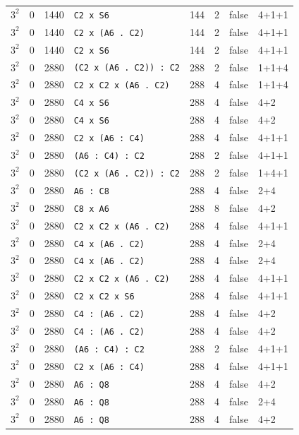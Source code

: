 \begin{longtable}{llrlrrll}
$3^2$ & 0 & 1440 & \texttt{C2 x S6} & 144 & 2 & false & 4+1+1\\
$3^2$ & 0 & 1440 & \texttt{C2 x (A6 . C2)} & 144 & 2 & false & 4+1+1\\
$3^2$ & 0 & 1440 & \texttt{C2 x S6} & 144 & 2 & false & 4+1+1\\
$3^2$ & 0 & 2880 & \texttt{(C2 x (A6 . C2)) : C2} & 288 & 2 & false & 1+1+4\\
$3^2$ & 0 & 2880 & \texttt{C2 x C2 x (A6 . C2)} & 288 & 4 & false & 1+1+4\\
$3^2$ & 0 & 2880 & \texttt{C4 x S6} & 288 & 4 & false & 4+2\\
$3^2$ & 0 & 2880 & \texttt{C4 x S6} & 288 & 4 & false & 4+2\\
$3^2$ & 0 & 2880 & \texttt{C2 x (A6 : C4)} & 288 & 4 & false & 4+1+1\\
$3^2$ & 0 & 2880 & \texttt{(A6 : C4) : C2} & 288 & 2 & false & 4+1+1\\
$3^2$ & 0 & 2880 & \texttt{(C2 x (A6 . C2)) : C2} & 288 & 2 & false & 1+4+1\\
$3^2$ & 0 & 2880 & \texttt{A6 : C8} & 288 & 4 & false & 2+4\\
$3^2$ & 0 & 2880 & \texttt{C8 x A6} & 288 & 8 & false & 4+2\\
$3^2$ & 0 & 2880 & \texttt{C2 x C2 x (A6 . C2)} & 288 & 4 & false & 4+1+1\\
$3^2$ & 0 & 2880 & \texttt{C4 x (A6 . C2)} & 288 & 4 & false & 2+4\\
$3^2$ & 0 & 2880 & \texttt{C4 x (A6 . C2)} & 288 & 4 & false & 2+4\\
$3^2$ & 0 & 2880 & \texttt{C2 x C2 x (A6 . C2)} & 288 & 4 & false & 4+1+1\\
$3^2$ & 0 & 2880 & \texttt{C2 x C2 x S6} & 288 & 4 & false & 4+1+1\\
$3^2$ & 0 & 2880 & \texttt{C4 : (A6 . C2)} & 288 & 4 & false & 4+2\\
$3^2$ & 0 & 2880 & \texttt{C4 : (A6 . C2)} & 288 & 4 & false & 4+2\\
$3^2$ & 0 & 2880 & \texttt{(A6 : C4) : C2} & 288 & 2 & false & 4+1+1\\
$3^2$ & 0 & 2880 & \texttt{C2 x (A6 : C4)} & 288 & 4 & false & 4+1+1\\
$3^2$ & 0 & 2880 & \texttt{A6 : Q8} & 288 & 4 & false & 4+2\\
$3^2$ & 0 & 2880 & \texttt{A6 : Q8} & 288 & 4 & false & 2+4\\
$3^2$ & 0 & 2880 & \texttt{A6 : Q8} & 288 & 4 & false & 4+2\\

\end{longtable}
